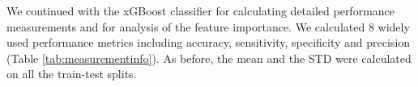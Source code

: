 \documentclass{bmcart}
\begin{document}





We continued with the xGBoost classifier for calculating detailed performance measurements and for analysis of the feature importance. We calculated 8 widely used performance metrics including accuracy, sensitivity, specificity and precision (Table \ref{tab:measurementinfo}). As before, the mean and the STD were calculated on all the train-test splits.
\end{document}
